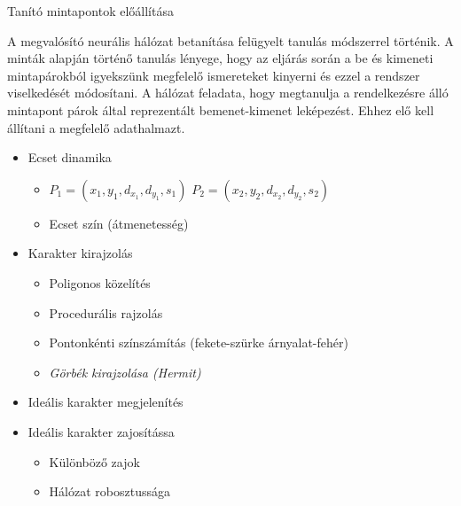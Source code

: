 
Tanító mintapontok előállítása

A megvalósító neurális hálózat betanítása felügyelt tanulás módszerrel történik. A minták alapján történő tanulás lényege, hogy az eljárás során a be és kimeneti mintapárokból igyekszünk megfelelő ismereteket kinyerni és ezzel a rendszer viselkedését módosítani. A hálózat feladata, hogy megtanulja a rendelkezésre álló mintapont párok által reprezentált bemenet-kimenet leképezést. Ehhez elő kell állítani a megfelelő adathalmazt.

\begin{itemize}
\item Ecset dinamika
	\begin{itemize}
	\item \(P_1 = (x_1, y_1, d_{x_1}, d_{y_1}, s_1)\) \(P_2 = (x_2, y_2, d_{x_2}, d_{y_2}, s_2)\)
	\item Ecset szín (átmenetesség)
	\end{itemize}
\item Karakter kirajzolás
	\begin{itemize}
	\item Poligonos közelítés
	\item Procedurális rajzolás
	\item Pontonkénti színszámítás (fekete-szürke árnyalat-fehér)
	\item \textit{Görbék kirajzolása (Hermit)}
	\end{itemize}
\item Ideális karakter megjelenítés
\item Ideális karakter zajosítássa
	\begin{itemize}
	\item Különböző zajok
	\item Hálózat robosztussága
	\end{itemize}
\end{itemize}

\begin{comment}{Dolgozok a Hermit-es részen.}
\end{comment}

\begin{comment}{Ezek így vázlatnak jók, viszont az egyes pontokból legalább külön-külön szakaszoknak kellene majd lenni!}
\end{comment}
